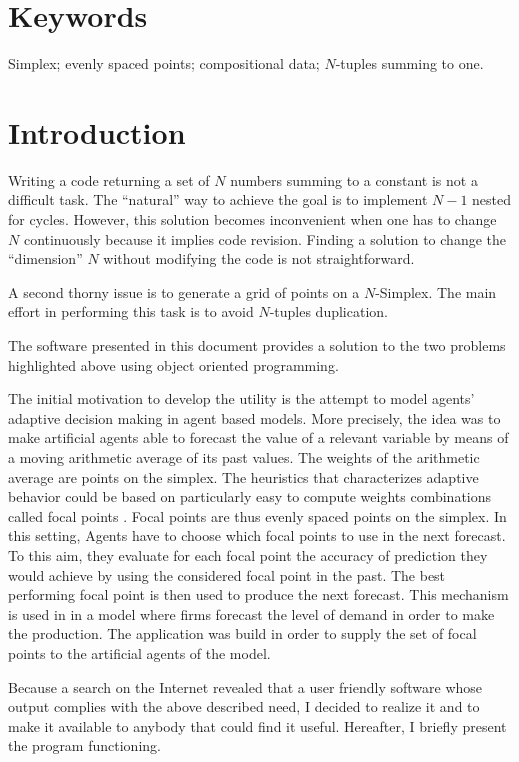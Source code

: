 \documentclass{jors}
\begin{document}
\section*{Keywords}

Simplex; evenly spaced points; compositional data; $N$-tuples summing to one.

\section*{Introduction}

Writing a code returning a set of $N$ numbers summing to a constant is not a difficult task. The ``natural'' way to achieve the goal is to implement $N-1$ nested for cycles. However, this solution becomes inconvenient when one has to change $N$ continuously because it implies code revision. Finding a solution to change the ``dimension'' $N$ without modifying the code is not straightforward. 

A second thorny issue is to generate a grid of points on a $N$-Simplex. The main effort in performing this task is to avoid $N$-tuples duplication.

The software presented in this document provides a solution to the two problems highlighted above using object oriented programming.     

The initial motivation to develop the utility is the attempt to model agents' adaptive decision making in agent based models. More precisely, the idea was to make artificial agents able to forecast the value of a relevant variable by means of a moving arithmetic average of its past values. The weights of the arithmetic average are points on the simplex. The heuristics that characterizes adaptive behavior \cite{gigerenzeretal11} could be based on particularly easy to compute weights combinations called focal points \cite{schelling60}. Focal points are thus evenly spaced points on the simplex. In this setting, Agents have to choose which focal points to use in the next forecast. To this aim, they evaluate for each focal point the accuracy of prediction they would achieve by using the considered focal point in the past. The best performing focal point is then used to produce the next forecast. 
This mechanism is used in \cite{icaart12} in a model where firms forecast the level of demand in order to make the production. 
The application was build in order to supply the set of focal points to the artificial agents of the model.

Because a search on the Internet revealed that a user friendly software whose output complies with the above described need, I decided to realize it and to make it available to anybody that could find it useful. Hereafter, I briefly present the program functioning.
\end{document}
